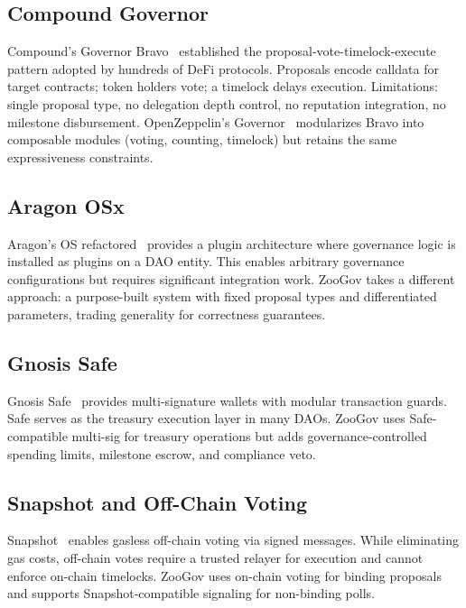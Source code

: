 \documentclass[11pt,letterpaper]{article}
\begin{document}
\subsection{Compound Governor}

Compound's Governor Bravo~\cite{compound2020governance} established the proposal-vote-timelock-execute pattern adopted by hundreds of DeFi protocols. Proposals encode calldata for target contracts; token holders vote; a timelock delays execution. Limitations: single proposal type, no delegation depth control, no reputation integration, no milestone disbursement. OpenZeppelin's Governor~\cite{oz2023governor} modularizes Bravo into composable modules (voting, counting, timelock) but retains the same expressiveness constraints.

\subsection{Aragon OSx}

Aragon's OS refactored~\cite{aragon2023osx} provides a plugin architecture where governance logic is installed as plugins on a DAO entity. This enables arbitrary governance configurations but requires significant integration work. ZooGov takes a different approach: a purpose-built system with fixed proposal types and differentiated parameters, trading generality for correctness guarantees.

\subsection{Gnosis Safe}

Gnosis Safe~\cite{gnosis2021safe} provides multi-signature wallets with modular transaction guards. Safe serves as the treasury execution layer in many DAOs. ZooGov uses Safe-compatible multi-sig for treasury operations but adds governance-controlled spending limits, milestone escrow, and compliance veto.

\subsection{Snapshot and Off-Chain Voting}

Snapshot~\cite{snapshot2021} enables gasless off-chain voting via signed messages. While eliminating gas costs, off-chain votes require a trusted relayer for execution and cannot enforce on-chain timelocks. ZooGov uses on-chain voting for binding proposals and supports Snapshot-compatible signaling for non-binding polls.
\end{document}
